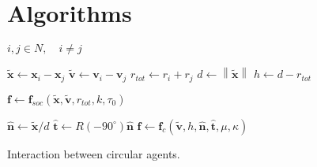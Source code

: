 \section{Algorithms}

\renewcommand{\algorithmiccomment}[1]{{\hspace{1.0 em}\color{gray}\textit{// #1}}}  %

\begin{algorithm}[H]
\begin{algorithmic}[1]  %
\REQUIRE $ i,j \in N, \quad i \neq j $
\ENSURE

\STATE $ \tilde{\mathbf{x}} \gets \mathbf{x}_{i} - \mathbf{x}_{j} $
\STATE $ \tilde{\mathbf{v}} \gets \mathbf{v}_{i} - \mathbf{v}_{j} $
\STATE $ r_{tot} \gets r_{i} + r_{j} $ 
\STATE $ d \gets \left\|\tilde{\mathbf{x}}\right\| $
\STATE $ h \gets d - r_{tot} $
\STATE

\STATE $ \mathbf{f} \gets \mathbf{f}_{soc}(\tilde{\mathbf{x}}, \tilde{\mathbf{v}}, r_{tot}, k, \tau_{0}) $

\STATE

\STATE $ \hat{\mathbf{n}} \gets \tilde{\mathbf{x}} / d $
\STATE $ \hat{\mathbf{t}} \gets R(-90^{\circ}) \hat{\mathbf{n}} $
\STATE $ \mathbf{f} \gets \mathbf{f}_{c}(\tilde{\mathbf{v}}, h, \hat{\mathbf{n}}, \hat{\mathbf{t}}, \mu, \kappa) $
\ENDIF
\ENDIF
\STATE $  $
\end{algorithmic}
\caption{Interaction between circular agents.}
\end{algorithm}



